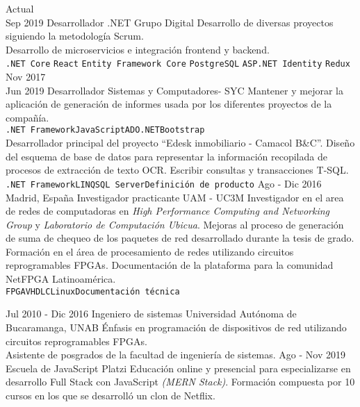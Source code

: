 \documentclass[9pt]{developercv}
\begin{document}
	\begin{entrylist}
		\entry
		{Actual\\Sep 2019}
		{Desarrollador .NET}
		{Grupo Digital}
		{
			Desarrollo de diversas proyectos siguiendo la metodología Scrum.\\
			Desarrollo de microservicios e integración frontend y backend.\\
			\texttt{.NET Core}\slashsep
			\texttt{React}\slashsep
			\texttt{Entity Framework Core}\slashsep
			\texttt{PostgreSQL}\slashsep
			\texttt{ASP.NET Identity}\slashsep
			\texttt{Redux}
		}
		\entry
		{Nov 2017\\Jun 2019}
		{Desarrollador}
		{Sistemas y Computadores- SYC}
		{
			Mantener y mejorar la aplicación de generación de informes usada por los diferentes proyectos de la compañía.\\
			\texttt{.NET Framework\slashsep JavaScript\slashsep ADO.NET\slashsep Bootstrap}\\
			Desarrollador principal del proyecto “Edesk inmobiliario - Camacol B\&C”. Diseño del esquema de base de datos para representar la información recopilada de procesos de extracción de texto OCR. Escribir consultas y transacciones T-SQL.\\
			\texttt{.NET Framework\slashsep LINQ\slashsep SQL Server\slashsep Definición de producto}
		}
		\entry
		{Ago - Dic 2016\\Madrid, España}
		{Investigador practicante}
		{UAM - UC3M}
		{
			Investigador en el area de redes de computadoras en \textit{High Performance Computing and Networking Group} y \textit{Laboratorio de Computación Ubicua}.
			Mejoras al proceso de generación de suma de chequeo de los paquetes de red desarrollado durante la tesis de grado.
			Formación en el área de procesamiento de redes utilizando circuitos reprogramables FPGAs.
			Documentación de la plataforma para la comunidad NetFPGA Latinoamérica.\\
			\texttt{FPGA\slashsep VHDL\slashsep C\slashsep Linux\slashsep Documentación técnica}                
		}
	\end{entrylist}
	\vspace{-\baselineskip}
	
	\cvsect{Educación}
	\begin{entrylist}
		\entry
		{Jul 2010 - Dic 2016}
		{Ingeniero de sistemas}
		{Universidad Autónoma de Bucaramanga, UNAB}
		{	Énfasis en programación de dispositivos de red utilizando circuitos reprogramables FPGAs.\\
			Asistente de posgrados de la facultad de ingeniería de sistemas.
		}
		\entry
		{Ago - Nov 2019}
		{Escuela de JavaScript}
		{Platzi}
		{Educación online y presencial para especializarse en desarrollo Full Stack con JavaScript \textit{(MERN Stack)}. Formación compuesta por 10 cursos en los que se desarrolló un clon de Netflix.}		
	\end{entrylist}
	\vspace{-\baselineskip}
	
\end{document}
